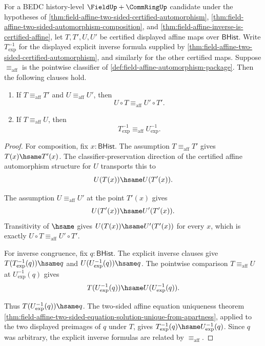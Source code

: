 \begin{theorem}
\label{thm:field-affine-pointwise-classifier-operation-congruence}
For a BEDC history-level $\FieldUp+\CommRingUp$ candidate under the hypotheses
of \autoref{thm:field-affine-two-sided-certified-automorphism},
\autoref{thm:field-affine-two-sided-automorphism-composition}, and
\autoref{thm:field-affine-inverse-is-certified-affine}, let $T,T',U,U'$ be
certified displayed affine maps over $\mathsf{BHist}$. Write
$T^{-1}_{\mathrm{exp}}$ for the displayed explicit inverse formula supplied by
\autoref{thm:field-affine-two-sided-certified-automorphism}, and similarly for
the other certified maps. Suppose $\equiv_{\mathrm{aff}}$ is the pointwise
classifier of \autoref{def:field-affine-automorphism-package}. Then the
following clauses hold.
\begin{enumerate}
\item If $T\equiv_{\mathrm{aff}}T'$ and $U\equiv_{\mathrm{aff}}U'$, then
$$
U\circ T\equiv_{\mathrm{aff}}U'\circ T'.
$$
\item If $T\equiv_{\mathrm{aff}}U$, then
$$
T^{-1}_{\mathrm{exp}}\equiv_{\mathrm{aff}}U^{-1}_{\mathrm{exp}}.
$$
\end{enumerate}
\end{theorem}
\begin{proof}
For composition, fix $x:\mathsf{BHist}$. The assumption
$T\equiv_{\mathrm{aff}}T'$ gives $T(x)\hsame T'(x)$. The classifier-preservation
direction of the certified affine automorphism structure for $U$ transports
this to
$$
U(T(x))\hsame U(T'(x)).
$$

The assumption $U\equiv_{\mathrm{aff}}U'$ at the point $T'(x)$ gives
$$
U(T'(x))\hsame U'(T'(x)).
$$
Transitivity of $\hsame$ gives $U(T(x))\hsame U'(T'(x))$ for every $x$, which
is exactly $U\circ T\equiv_{\mathrm{aff}}U'\circ T'$.

For inverse congruence, fix $q:\mathsf{BHist}$. The explicit inverse clauses
give $T(T^{-1}_{\mathrm{exp}}(q))\hsame q$ and
$U(U^{-1}_{\mathrm{exp}}(q))\hsame q$. The pointwise comparison
$T\equiv_{\mathrm{aff}}U$ at $U^{-1}_{\mathrm{exp}}(q)$ gives
$$
T(U^{-1}_{\mathrm{exp}}(q))\hsame U(U^{-1}_{\mathrm{exp}}(q)).
$$

Thus $T(U^{-1}_{\mathrm{exp}}(q))\hsame q$. The two-sided affine equation
uniqueness theorem
\autoref{thm:field-affine-two-sided-equation-solution-unique-from-apartness},
applied to the two displayed preimages of $q$ under $T$, gives
$T^{-1}_{\mathrm{exp}}(q)\hsame U^{-1}_{\mathrm{exp}}(q)$. Since $q$ was
arbitrary, the explicit inverse formulas are related by
$\equiv_{\mathrm{aff}}$.
\end{proof}


